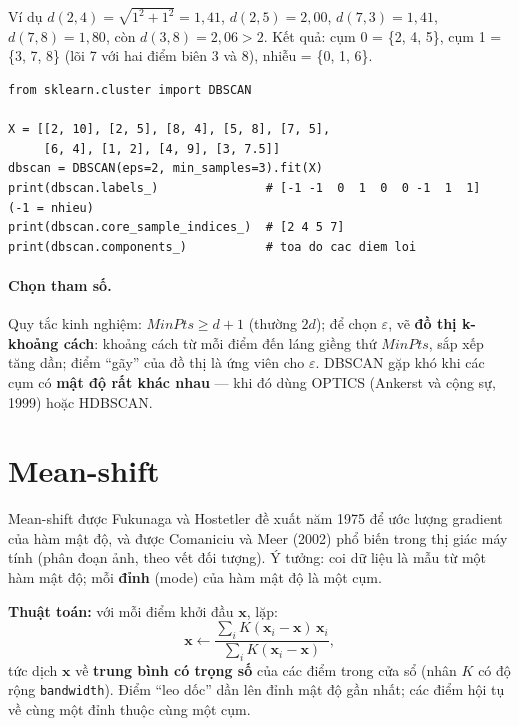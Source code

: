 Ví dụ $d(2, 4) = \sqrt{1^2 + 1^2} = 1{,}41$, $d(2, 5) = 2{,}00$, $d(7, 3) = 1{,}41$, $d(7, 8) = 1{,}80$, còn $d(3, 8) = 2{,}06 > 2$. Kết quả: cụm 0 = \{2, 4, 5\}, cụm 1 = \{3, 7, 8\} (lõi 7 với hai điểm biên 3 và 8), nhiễu = \{0, 1, 6\}.

\begin{lstlisting}[caption={DBSCAN với scikit-learn (ví dụ trên lớp)}]
from sklearn.cluster import DBSCAN

X = [[2, 10], [2, 5], [8, 4], [5, 8], [7, 5],
     [6, 4], [1, 2], [4, 9], [3, 7.5]]
dbscan = DBSCAN(eps=2, min_samples=3).fit(X)
print(dbscan.labels_)               # [-1 -1  0  1  0  0 -1  1  1]  (-1 = nhieu)
print(dbscan.core_sample_indices_)  # [2 4 5 7]
print(dbscan.components_)           # toa do cac diem loi
\end{lstlisting}


\paragraph{Chọn tham số.} Quy tắc kinh nghiệm: $\mathit{MinPts} \geq d + 1$ (thường $2d$); để chọn $\varepsilon$, vẽ \textbf{đồ thị k-khoảng cách}: khoảng cách từ mỗi điểm đến láng giềng thứ $\mathit{MinPts}$, sắp xếp tăng dần; điểm ``gãy'' của đồ thị là ứng viên cho $\varepsilon$. DBSCAN gặp khó khi các cụm có \textbf{mật độ rất khác nhau} --- khi đó dùng OPTICS (Ankerst và cộng sự, 1999) hoặc HDBSCAN.

\section{Mean-shift}

Mean-shift được Fukunaga và Hostetler đề xuất năm 1975 để ước lượng gradient của hàm mật độ, và được Comaniciu và Meer (2002) phổ biến trong thị giác máy tính (phân đoạn ảnh, theo vết đối tượng). Ý tưởng: coi dữ liệu là mẫu từ một hàm mật độ; mỗi \textbf{đỉnh} (mode) của hàm mật độ là một cụm.

\noindent\textbf{Thuật toán:} với mỗi điểm khởi đầu $\mathbf{x}$, lặp:
\begin{equation}
    \mathbf{x} \leftarrow \frac{\sum_{i} K(\mathbf{x}_i - \mathbf{x})\,\mathbf{x}_i}{\sum_{i} K(\mathbf{x}_i - \mathbf{x})},
\end{equation}
tức dịch $\mathbf{x}$ về \textbf{trung bình có trọng số} của các điểm trong cửa sổ (nhân $K$ có độ rộng \texttt{bandwidth}). Điểm ``leo dốc'' dần lên đỉnh mật độ gần nhất; các điểm hội tụ về cùng một đỉnh thuộc cùng một cụm.

